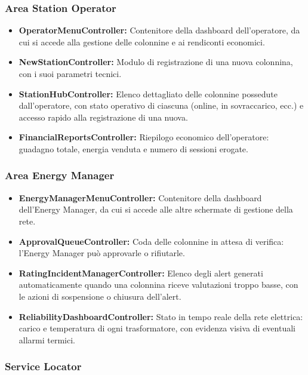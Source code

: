 \subsubsection{Area Station Operator}

\begin{itemize}
    \item \textbf{OperatorMenuController:} Contenitore della dashboard dell'operatore, da cui si accede alla gestione delle colonnine e ai rendiconti economici.
    \item \textbf{NewStationController:} Modulo di registrazione di una nuova colonnina, con i suoi parametri tecnici.
    \item \textbf{StationHubController:} Elenco dettagliato delle colonnine possedute dall'operatore, con stato operativo di ciascuna (online, in sovraccarico, ecc.) e accesso rapido alla registrazione di una nuova.
    \item \textbf{FinancialReportsController:} Riepilogo economico dell'operatore: guadagno totale, energia venduta e numero di sessioni erogate.
\end{itemize}

\subsubsection{Area Energy Manager}

\begin{itemize}
    \item \textbf{EnergyManagerMenuController:} Contenitore della dashboard dell'Energy Manager, da cui si accede alle altre schermate di gestione della rete.
    \item \textbf{ApprovalQueueController:} Coda delle colonnine in attesa di verifica: l'Energy Manager può approvarle o rifiutarle.
    \item \textbf{RatingIncidentManagerController:} Elenco degli alert generati automaticamente quando una colonnina riceve valutazioni troppo basse, con le azioni di sospensione o chiusura dell'alert.
    \item \textbf{ReliabilityDashboardController:} Stato in tempo reale della rete elettrica: carico e temperatura di ogni trasformatore, con evidenza visiva di eventuali allarmi termici.
\end{itemize}

\subsubsection{Service Locator}
\label{subsec:servicelocator}

